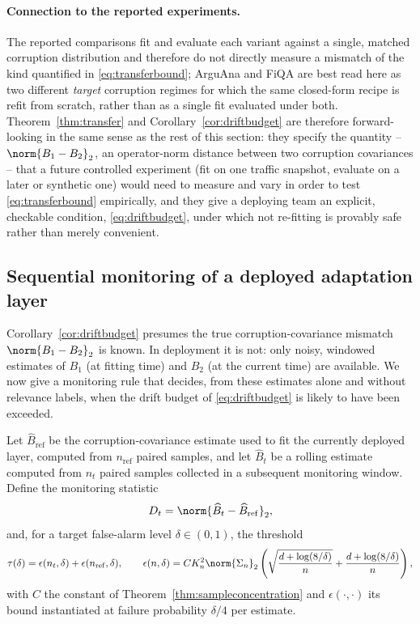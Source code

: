\paragraph{Connection to the reported experiments.}
The reported comparisons fit and evaluate each variant against a single,
matched corruption distribution and therefore do not directly measure a
mismatch of the kind quantified in \cref{eq:transferbound}; ArguAna and
FiQA are best read here as two different \emph{target} corruption
regimes for which the same closed-form recipe is refit from scratch,
rather than as a single fit evaluated under both. Theorem~\ref{thm:transfer}
and Corollary~\ref{cor:driftbudget} are therefore forward-looking in the
same sense as the rest of this section: they specify the quantity --
$\norm{B_1-B_2}_2$, an operator-norm distance between two corruption
covariances -- that a future controlled experiment (fit on one traffic
snapshot, evaluate on a later or synthetic one) would need to measure and
vary in order to test \cref{eq:transferbound} empirically, and they give a
deploying team an explicit, checkable condition, \cref{eq:driftbudget},
under which not re-fitting is provably safe rather than merely convenient.

\subsection{Sequential monitoring of a deployed adaptation layer}
\label{sec:drift-monitoring}

Corollary~\ref{cor:driftbudget} presumes the true corruption-covariance
mismatch $\norm{B_1-B_2}_2$ is known. In deployment it is not: only noisy,
windowed estimates of $B_1$ (at fitting time) and $B_2$ (at the current
time) are available. We now give a monitoring rule that decides, from these
estimates alone and without relevance labels, when the drift budget of
\cref{eq:driftbudget} is likely to have been exceeded.

Let $\widehat B_{\mathrm{ref}}$ be the corruption-covariance estimate used
to fit the currently deployed layer, computed from $n_{\mathrm{ref}}$
paired samples, and let $\widehat B_t$ be a rolling estimate computed from
$n_t$ paired samples collected in a subsequent monitoring window. Define
the monitoring statistic
\begin{equation}
 D_t=\norm{\widehat B_t-\widehat B_{\mathrm{ref}}}_2,
\end{equation}
and, for a target false-alarm level $\delta\in(0,1)$, the threshold
\begin{equation}
 \tau(\delta)=
 \epsilon(n_t,\delta)+\epsilon(n_{\mathrm{ref}},\delta),
 \qquad
 \epsilon(n,\delta)=CK_n^2\norm{\Sigma_n}_2
 \left(\sqrt{\frac{d+\log(8/\delta)}{n}}+\frac{d+\log(8/\delta)}{n}\right),
 \label{eq:driftthreshold}
\end{equation}
with $C$ the constant of Theorem~\ref{thm:sampleconcentration} and
$\epsilon(\cdot,\cdot)$ its bound instantiated at failure probability
$\delta/4$ per estimate.

